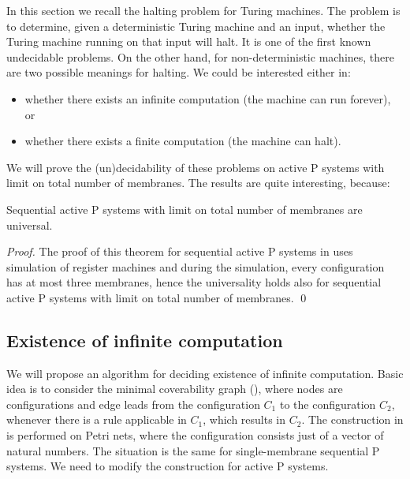 \documentclass[llncs,submission,copyright,creativecommons]{../lib/lncs/llncs}
\begin{document}
In this section we recall the halting problem for Turing machines. The problem is to determine, given a deterministic Turing machine and an input, whether the Turing machine running on that input will halt. It is one of the first known undecidable problems. On the other hand, for non-deterministic machines, there are two possible meanings for halting. We could be interested either in:
\begin{itemize}
  \item whether there exists an infinite computation (the machine can run forever), or
  \item whether there exists a finite computation (the machine can halt).
\end{itemize}

We will prove the (un)decidability of these problems on active P systems with limit on total number of membranes. The results are quite interesting, because:

\begin{theorem}
  Sequential active P systems with limit on total number of membranes are universal.
\end{theorem}

\begin{proof}
  The proof of this theorem for sequential active P systems in \cite{Ibarra05Active} uses simulation of register machines and during the simulation, every configuration has at most three membranes, hence the universality holds also for sequential active P systems with limit on total number of membranes.
  \qed
\end{proof}

\subsection{Existence of infinite computation} %
\label{sub:existence_of_infinite_computation}

We will propose an algorithm for deciding existence of infinite computation. Basic idea is to consider the minimal coverability graph (\cite{Rozenberg93MinimalCoverabilityGraph}), where nodes are configurations and edge leads from the configuration $C_1$ to the configuration $C_2$, whenever there is a rule applicable in $C_1$, which results in $C_2$. The construction in \cite{Rozenberg93MinimalCoverabilityGraph} is performed on Petri nets, where the configuration consists just of a vector of natural numbers. The situation is the same for single-membrane sequential P systems. We need to modify the construction for active P systems.
\end{document}
